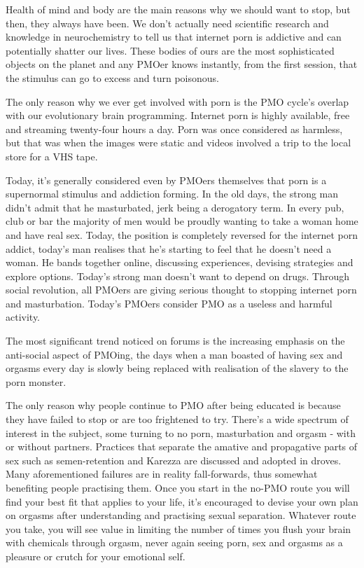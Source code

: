 \documentclass[easypeasy.tex]{subfiles}
\begin{document}
Health of mind and body are the main reasons why we should want to stop, but then, they always have been. We don't actually need scientific research and knowledge in neurochemistry to tell us that internet porn is addictive and can potentially shatter our lives. These bodies of ours are the most sophisticated objects on the planet and any PMOer knows instantly, from the first session, that the stimulus can go to excess and turn poisonous.

The only reason why we ever get involved with porn is the PMO cycle's overlap with our evolutionary brain programming. Internet porn is highly available, free and streaming twenty-four hours a day. Porn was once considered as harmless, but that was when the images were static and videos involved a trip to the local store for a VHS tape.

Today, it's generally considered even by PMOers themselves that porn is a supernormal stimulus and addiction forming. In the old days, the strong man didn't admit that he masturbated, jerk being a derogatory term. In every pub, club or bar the majority of men would be proudly wanting to take a woman home and have real sex. Today, the position is completely reversed for the internet porn addict, today's man realises that he's starting to feel that he doesn't need a woman. He bands together online, discussing experiences, devising strategies and explore options. Today's strong man doesn't want to depend on drugs. Through social revolution, all PMOers are giving serious thought to stopping internet porn and masturbation. Today's PMOers consider PMO as a useless and harmful activity.

The most significant trend noticed on forums is the increasing emphasis on the anti-social aspect of PMOing, the days when a man boasted of having sex and orgasms every day is slowly being replaced with realisation of the slavery to the porn monster.

The only reason why people continue to PMO after being educated is because they have failed to stop or are too frightened to try. There's a wide spectrum of interest in the subject, some turning to no porn, masturbation and orgasm - with or without partners. Practices that separate the amative and propagative parts of sex such as semen-retention and Karezza are discussed and adopted in droves. Many aforementioned failures are in reality fall-forwards, thus somewhat benefiting people practising them. Once you start in the no-PMO route you will find your best fit that applies to your life, it's encouraged to devise your own plan on orgasms after understanding and practising sexual separation. Whatever route you take, you will see value in limiting the number of times you flush your brain with chemicals through orgasm, never again seeing porn, sex and orgasms as a pleasure or crutch for your emotional self.
\end{document}
